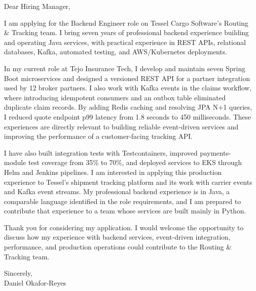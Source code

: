 \documentclass[11pt,a4paper]{article}
\begin{document}
Dear Hiring Manager,

I am applying for the Backend Engineer role on Tessel Cargo Software’s Routing \& Tracking team. I bring seven years of professional backend experience building and operating Java services, with practical experience in REST APIs, relational databases, Kafka, automated testing, and AWS/Kubernetes deployments.

In my current role at Tejo Insurance Tech, I develop and maintain seven Spring Boot microservices and designed a versioned REST API for a partner integration used by 12 broker partners. I also work with Kafka events in the claims workflow, where introducing idempotent consumers and an outbox table eliminated duplicate claim records. By adding Redis caching and resolving JPA N+1 queries, I reduced quote endpoint p99 latency from 1.8 seconds to 450 milliseconds. These experiences are directly relevant to building reliable event-driven services and improving the performance of a customer-facing tracking API.

I have also built integration tests with Testcontainers, improved payments-module test coverage from 35\% to 70\%, and deployed services to EKS through Helm and Jenkins pipelines. I am interested in applying this production experience to Tessel’s shipment tracking platform and its work with carrier events and Kafka event streams. My professional backend experience is in Java, a comparable language identified in the role requirements, and I am prepared to contribute that experience to a team whose services are built mainly in Python.

Thank you for considering my application. I would welcome the opportunity to discuss how my experience with backend services, event-driven integration, performance, and production operations could contribute to the Routing \& Tracking team.

Sincerely,\\
Daniel Okafor-Reyes
\end{document}
